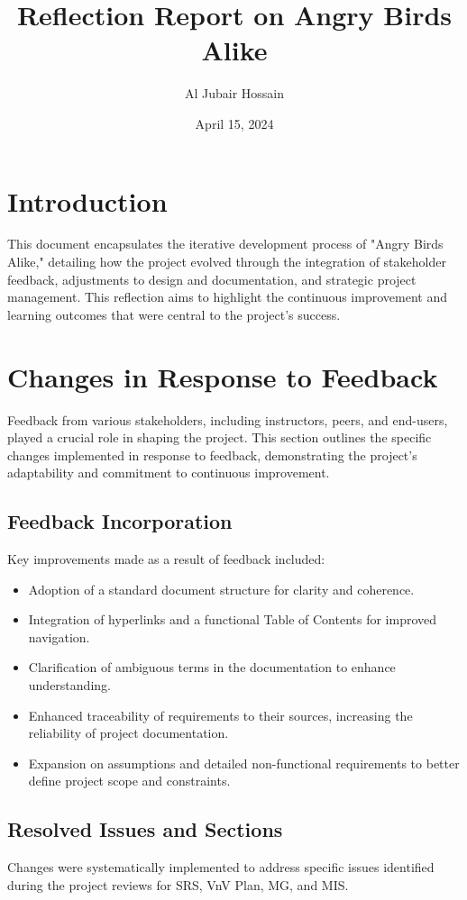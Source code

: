 \documentclass[12pt]{article}
\title{Reflection Report on Angry Birds Alike}
\author{Al Jubair Hossain}
\date{April 15, 2024}
\begin{document}
\maketitle
\tableofcontents
\newpage

\section{Introduction}
This document encapsulates the iterative development process of "Angry Birds Alike," detailing how the project evolved through the integration of stakeholder feedback, adjustments to design and documentation, and strategic project management. This reflection aims to highlight the continuous improvement and learning outcomes that were central to the project's success.

\section{Changes in Response to Feedback}
Feedback from various stakeholders, including instructors, peers, and end-users, played a crucial role in shaping the project. This section outlines the specific changes implemented in response to feedback, demonstrating the project's adaptability and commitment to continuous improvement.

\subsection{Feedback Incorporation}
Key improvements made as a result of feedback included:
\begin{itemize}
    \item Adoption of a standard document structure for clarity and coherence.
    \item Integration of hyperlinks and a functional Table of Contents for improved navigation.
    \item Clarification of ambiguous terms in the documentation to enhance understanding.
    \item Enhanced traceability of requirements to their sources, increasing the reliability of project documentation.
    \item Expansion on assumptions and detailed non-functional requirements to better define project scope and constraints.
\end{itemize}

\subsection{Resolved Issues and Sections}
Changes were systematically implemented to address specific issues identified during the project reviews for SRS, VnV Plan, MG, and MIS. 
\end{document}
